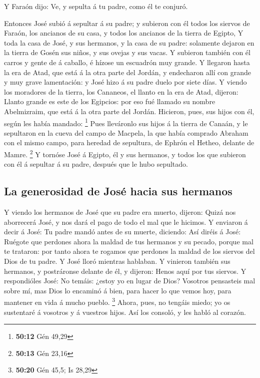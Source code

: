 Y Faraón dijo: Ve, y sepulta á tu padre, como él te
conjuró.

 Entonces José subió á sepultar á su padre; y subieron con
él todos los siervos de Faraón, los ancianos de su casa, y todos los
ancianos de la tierra de Egipto,  Y toda la casa de José,
y sus hermanos, y la casa de su padre: solamente dejaron en la tierra de
Gosén sus niños, y sus ovejas y sus vacas.  Y subieron
también con él carros y gente de á caballo, é hízose un escuadrón muy
grande.  Y llegaron hasta la era de Atad, que está á la
otra parte del Jordán, y endecharon allí con grande y muy grave
lamentación: y José hizo á su padre duelo por siete días.
 Y viendo los moradores de la tierra, los Cananeos, el
llanto en la era de Atad, dijeron: Llanto grande es este de los
Egipcios: por eso fué llamado su nombre Abelmizraim, que está á la otra
parte del Jordán.  Hicieron, pues, sus hijos con él,
según les había mandado: \footnote{\textbf{50:12} Gén 49,29}
 Pues lleváronlo sus hijos á la tierra de Canaán, y le
sepultaron en la cueva del campo de Macpela, la que había comprado
Abraham con el mismo campo, para heredad de sepultura, de Ephrón el
Hetheo, delante de Mamre. \footnote{\textbf{50:13} Gén 23,16}
 Y tornóse José á Egipto, él y sus hermanos, y todos los
que subieron con él á sepultar á su padre, después que le hubo
sepultado.

\hypertarget{la-generosidad-de-josuxe9-hacia-sus-hermanos}{%
\subsection{La generosidad de José hacia sus
hermanos}\label{la-generosidad-de-josuxe9-hacia-sus-hermanos}}

 Y viendo los hermanos de José que su padre era muerto,
dijeron: Quizá nos aborrecerá José, y nos dará el pago de todo el mal
que le hicimos.  Y enviaron á decir á José: Tu padre
mandó antes de su muerte, diciendo:  Así diréis á José:
Ruégote que perdones ahora la maldad de tus hermanos y su pecado, porque
mal te trataron: por tanto ahora te rogamos que perdones la maldad de
los siervos del Dios de tu padre. Y José lloró mientras hablaban.
 Y vinieron también sus hermanos, y postráronse delante
de él, y dijeron: Henos aquí por tus siervos.  Y
respondióles José: No temáis: ¿estoy yo en lugar de Dios?
 Vosotros pensasteis mal sobre mí, mas Dios lo encaminó á
bien, para hacer lo que vemos hoy, para mantener en vida á mucho pueblo.
\footnote{\textbf{50:20} Gén 45,5; Is 28,29}  Ahora,
pues, no tengáis miedo; yo os sustentaré á vosotros y á vuestros hijos.
Así los consoló, y les habló al corazón.

